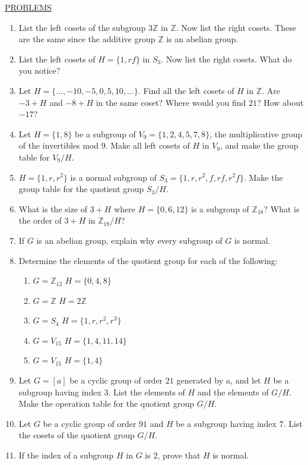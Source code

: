 \documentclass[12pt]{article}
\theoremstyle{definition}
\def\Z{\mathbb{Z}}
\begin{document}
\clearpage

\underline{PROBLEMS}

\begin{enumerate}
\item
List the left cosets of the subgroup $3\Z$ in $\Z$. Now list the right cosets. These are the same since the additive group $\Z$ is an abelian group.

\item
List the left cosets of $H =\{1,rf\}$ in $S_3$. Now list the right cosets. What do you notice?
\item
Let $H = \{...,-10, -5,0,5,10,...\}$. Find all the left cosets of $H$ in $\Z$. Are $-3 + H$ and $-8+H$ in the same coset? Where would you find $21$? How about $-17$?
\item
Let $H = \{1,8\}$ be a subgroup of $V_9 =\{1,2,4,5,7,8\}$, the multiplicative group of the invertibles mod $9$. Make all left cosets of $H$ in $V_9$, and make the group table for $V_9/H$.
\item
$H=\{1,r,r^2\}$ is a normal subgroup of $S_3 =\{1,r,r^2,f,rf,r^2f\}$. Make the group table for the quotient group $S_3/H$.
\item
What is the size of $3 + H$ where $H=\{0,6,12\}$ is a subgroup of $\Z_{18}$? What is the order of $3 + H$ in $\Z_{18}/H$?
\item
If $G$ is an abelian group, explain why every subgroup of $G$ is normal.
\item
Determine the elements of the quotient group  for each of the following:
\begin{enumerate}
\item
$G = \Z_{12}$    $H = \{0,4,8\}$
\item
$G = \Z$            $H = 2\Z$
\item
$G = S_4$         $H = \{1,r,r^2,r^3\}$
\item
$G = V_{15}$       $H = \{1,4,11,14\}$
\item
$G = V_{15}$         $H = \{1,4\}$
\end{enumerate}
\item
Let $G = [a]$ be a cyclic group of order $21$ generated by $a$, and let $H$ be a subgroup having index $3$.  List the elements of $H$ and the elements of $G/H$. Make the operation table for the quotient group $G/H$.
\item
Let $G$ be a cyclic group of order $91$ and $H$ be a subgroup having index $7$. List the cosets of the quotient group $G/H$.
\item
If the index of a subgroup $H$ in $G$ is $2$, prove that $H$ is normal.

\end{enumerate}
\end{document}
